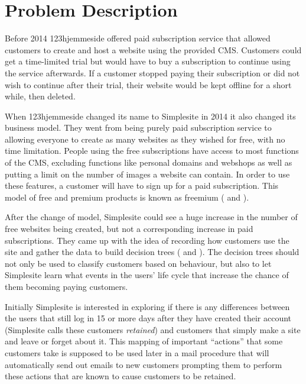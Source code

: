 \section{Problem Description}
\label{sec:probdesc}

Before 2014 123hjemmeside offered paid subscription service that allowed
customers to create and host a website using the provided CMS. Customers could
get a time-limited trial but would have to buy a subscription to continue using
the service afterwards. If a customer stopped paying their subscription or did
not wish to continue after their trial, their website would be kept offline for
a short while, then deleted.

When 123hjemmeside changed its name to Simplesite in 2014 it also changed its
business model. They went from being purely paid subscription service to
allowing everyone to create as many websites as they wished for free, with no
time limitation. People using the free subscriptions have access to most
functions of the CMS, excluding functions like personal domains and webshops as
well as putting a limit on the number of images a website can contain. In order
to use these features, a customer will have to sign up for a paid subscription.
This model of free and premium products is known as freemium (\cite[p.
6]{bekkelund2011succeeding} and \cite[p. 1]{pujol2010freemium}).

After the change of model, Simplesite could see a huge increase in the number of
free websites being created, but not a corresponding increase in paid
subscriptions. They came up with the idea of recording how customers use the
site and gather the data to build decision trees
(\cite{breiman1984classification} and \cite{quinlan1986induction}). The decision
trees should not only be used to classify customers based on behaviour, but also
to let Simplesite learn what events in the users' life cycle that increase the
chance of them becoming paying customers.

Initially Simplesite is interested in exploring if there is any differences
between the users that still log in 15 or more days after they have created
their account (Simplesite calls these customers \textit{retained}) and customers
that simply make a site and leave or forget about it. This mapping of important
``actions'' that some customers take is supposed to be used later in a mail
procedure that will automatically send out emails to new customers prompting
them to perform these actions that are known to cause customers to be retained.

